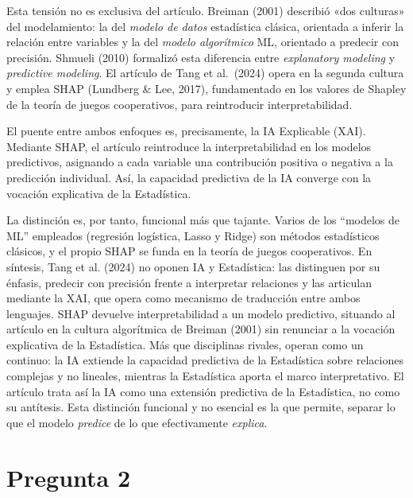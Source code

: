 \documentclass[11pt]{article}
\begin{document}
Esta tensión no es exclusiva del artículo. Breiman (2001) describió «dos culturas» del modelamiento: la del \textit{modelo de datos} estadística clásica, orientada a inferir la relación entre variables y la del \textit{modelo algorítmico} ML, orientado a predecir con precisión. Shmueli (2010) formalizó esta diferencia entre \textit{explanatory modeling} y \textit{predictive modeling}. El artículo de Tang et al.\ (2024) opera en la segunda cultura y emplea SHAP (Lundberg \& Lee, 2017), fundamentado en los valores de Shapley de la teoría de juegos cooperativos, para reintroducir interpretabilidad.

El puente entre ambos enfoques es, precisamente, la IA Explicable (XAI). Mediante SHAP, el artículo reintroduce la interpretabilidad en los modelos predictivos, asignando a cada variable una contribución positiva o negativa a la predicción individual. Así, la capacidad predictiva de la IA converge con la vocación explicativa de la Estadística.

La distinción es, por tanto, funcional más que tajante. Varios de los ``modelos de ML'' empleados (regresión logística, Lasso y Ridge) son métodos estadísticos clásicos, y el propio SHAP se funda en la teoría de juegos cooperativos. En síntesis, Tang et al. (2024) no oponen IA y Estadística: las distinguen por su énfasis, predecir con precisión frente a interpretar relaciones y las articulan mediante la XAI, que opera como mecanismo de traducción entre ambos lenguajes. SHAP devuelve interpretabilidad a un modelo predictivo, situando al artículo en la cultura algorítmica de Breiman (2001) sin renunciar a la vocación explicativa de la Estadística. Más que disciplinas rivales, operan como un continuo: la IA extiende la capacidad predictiva de la Estadística sobre relaciones complejas y no lineales, mientras la Estadística aporta el marco interpretativo. El artículo trata así la IA como una extensión predictiva de la Estadística, no como su antítesis. Esta distinción funcional y no esencial es la que permite, separar lo que el modelo \emph{predice} de lo que efectivamente \emph{explica}.
\clearpage

\section*{Pregunta 2}
\end{document}

